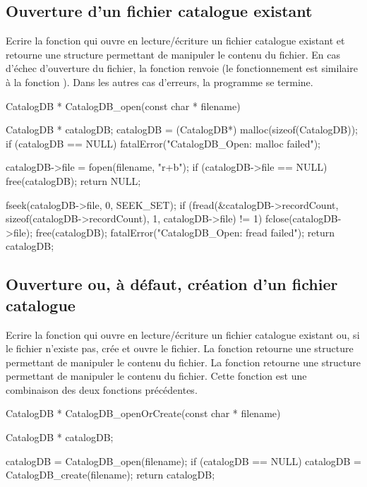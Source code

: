 \subsection{Ouverture d'un fichier catalogue existant}

Ecrire la fonction  qui ouvre en lecture/écriture un fichier catalogue existant et retourne une structure permettant de manipuler le contenu du fichier. En cas d'échec d'ouverture du fichier, la fonction renvoie  (le fonctionnement est similaire à la fonction ).  Dans les autres cas d'erreurs, la programme se termine.

\begin{csourcecorrection}
CatalogDB * CatalogDB_open(const char * filename) {
    CatalogDB * catalogDB;
    catalogDB = (CatalogDB*) malloc(sizeof(CatalogDB));
    if (catalogDB == NULL)
        fatalError("CatalogDB_Open: malloc failed");

    catalogDB->file = fopen(filename, "r+b");
    if (catalogDB->file == NULL) {
        free(catalogDB);
        return NULL;
    }

    fseek(catalogDB->file, 0, SEEK_SET);
    if (fread(&catalogDB->recordCount, sizeof(catalogDB->recordCount), 1, catalogDB->file) != 1) {
        fclose(catalogDB->file);
        free(catalogDB);
        fatalError("CatalogDB_Open: fread failed");
    }
    return catalogDB;
}
\end{csourcecorrection}


\subsection{Ouverture ou, à défaut, création d'un fichier catalogue}

Ecrire la fonction  qui ouvre en lecture/écriture un fichier catalogue existant ou, si le fichier n'existe pas, crée et ouvre le fichier. La fonction retourne une structure permettant de manipuler le contenu du fichier. La fonction retourne une structure permettant de manipuler le contenu du fichier. Cette fonction est une combinaison des deux fonctions précédentes.

\begin{csourcecorrection}
CatalogDB * CatalogDB_openOrCreate(const char * filename) {
    CatalogDB * catalogDB;

    catalogDB = CatalogDB_open(filename);
    if (catalogDB == NULL)
        catalogDB = CatalogDB_create(filename);
    return catalogDB;
}
\end{csourcecorrection}

